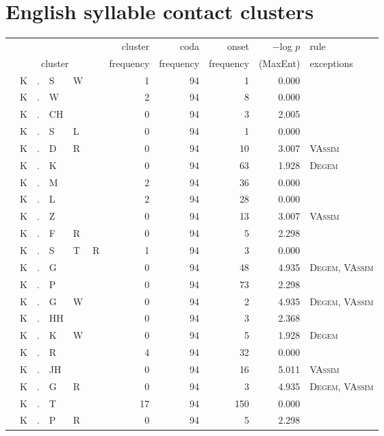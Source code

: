 \chapter{English syllable contact clusters} 
\label{clusters}

\begin{longtable}{r@{ } r@{ } c@{ } l@{ } l@{ } l@{ } r r r r l }
\toprule
 &   &   &  &   &  &  cluster  &  coda  &  onset  &  $-$log $p$  &  rule \\
\multicolumn{6}{c}{cluster}  &  frequency  &  frequency  &  frequency  &  (MaxEnt)  &  exceptions\\ 
\midrule
 & K & . & S & W &  & 1 & 94 & 1 & 0.000 &  \\
 & K & . & W &  &  & 2 & 94 & 8 & 0.000 &  \\
 & K & . & CH &  &  & 0 & 94 & 3 & 2.005 &  \\
 & K & . & S & L &  & 0 & 94 & 1 & 0.000 &  \\
 & K & . & D & R &  & 0 & 94 & 10 & 3.007 & \textsc{VAssim} \\
 & K & . & K &  &  & 0 & 94 & 63 & 1.928 & \textsc{Degem} \\
 & K & . & M &  &  & 2 & 94 & 36 & 0.000 &  \\
 & K & . & L &  &  & 2 & 94 & 28 & 0.000 &  \\
 & K & . & Z &  &  & 0 & 94 & 13 & 3.007 & \textsc{VAssim} \\
 & K & . & F & R &  & 0 & 94 & 5 & 2.298 &  \\
 & K & . & S & T & R & 1 & 94 & 3 & 0.000 &  \\
 & K & . & G &  &  & 0 & 94 & 48 & 4.935 & \textsc{Degem}, \textsc{VAssim} \\
 & K & . & P &  &  & 0 & 94 & 73 & 2.298 &  \\
 & K & . & G & W &  & 0 & 94 & 2 & 4.935 & \textsc{Degem}, \textsc{VAssim} \\
 & K & . & HH &  &  & 0 & 94 & 3 & 2.368 &  \\
 & K & . & K & W &  & 0 & 94 & 5 & 1.928 & \textsc{Degem} \\
 & K & . & R &  &  & 4 & 94 & 32 & 0.000 &  \\
 & K & . & JH &  &  & 0 & 94 & 16 & 5.011 & \textsc{VAssim} \\
 & K & . & G & R &  & 0 & 94 & 3 & 4.935 & \textsc{Degem}, \textsc{VAssim} \\
 & K & . & T &  &  & 17 & 94 & 150 & 0.000 &  \\
 & K & . & P & R &  & 0 & 94 & 5 & 2.298 &  \\

\end{longtable}
